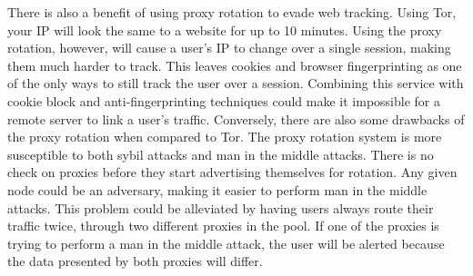 There is also a benefit of using proxy rotation to evade web tracking. Using Tor, your IP will look the same to a website for up to 10 minutes\cite{tor:faq}. Using the proxy rotation, however, will cause a user's IP to change over a single session, making them much harder to track. This leaves cookies and browser fingerprinting as one of the only ways to still track the user over a session. Combining this service with cookie block and anti-fingerprinting techniques could make it impossible for a remote server to link a user's traffic.
    Conversely, there are also some drawbacks of the proxy rotation when compared to Tor. The proxy rotation system is more susceptible to both sybil attacks and man in the middle attacks. There is no check on proxies before they start advertising themselves for rotation. Any given node could be an adversary, making it easier to perform man in the middle attacks. This problem could be alleviated by having users always route their traffic twice, through two different proxies in the pool. If one of the proxies is trying to perform a man in the middle attack, the user will be alerted because the data presented by both proxies will differ. 
